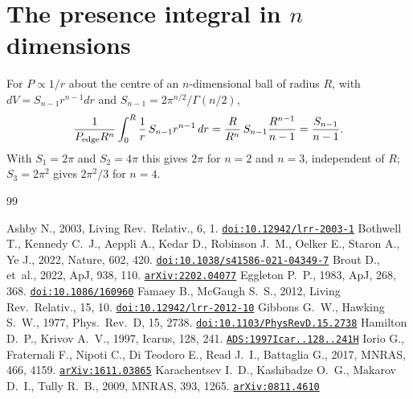 \documentclass[11pt]{article}
\begin{document}
\appendix
\section{The presence integral in $n$ dimensions}
\label{app:k}
For $P\propto1/r$ about the centre of an $n$-dimensional ball of radius $R$, with $dV=S_{n-1}r^{n-1}dr$ and $S_{n-1}=2\pi^{n/2}/\Gamma(n/2)$,
\begin{equation}
\frac{1}{P_{\rm edge}R^n}\int_0^R\frac{1}{r}\,S_{n-1}r^{n-1}\,dr=\frac{R}{R^n}\,S_{n-1}\frac{R^{n-1}}{n-1}=\frac{S_{n-1}}{n-1}.
\end{equation}
With $S_1=2\pi$ and $S_2=4\pi$ this gives $2\pi$ for $n=2$ and $n=3$, independent of $R$; $S_3=2\pi^2$ gives $2\pi^2/3$ for $n=4$.

\begin{thebibliography}{99}
\setlength{\itemsep}{1pt}\small\raggedright
{} Ashby N., 2003, Living Rev.\ Relativ., 6, 1. \href{https://doi.org/10.12942/lrr-2003-1}{\texttt{doi:10.12942/lrr-2003-1}}
 Bothwell T., Kennedy C.~J., Aeppli A., Kedar D., Robinson J.~M., Oelker E., Staron A., Ye J., 2022, Nature, 602, 420. \href{https://doi.org/10.1038/s41586-021-04349-7}{\texttt{doi:10.1038/s41586-021-04349-7}}
 Brout D., et~al., 2022, ApJ, 938, 110. \href{https://arxiv.org/abs/2202.04077}{\texttt{arXiv:2202.04077}}
 Eggleton P.~P., 1983, ApJ, 268, 368. \href{https://doi.org/10.1086/160960}{\texttt{doi:10.1086/160960}}
 Famaey B., McGaugh S.~S., 2012, Living Rev.\ Relativ., 15, 10. \href{https://doi.org/10.12942/lrr-2012-10}{\texttt{doi:10.12942/lrr-2012-10}}
 Gibbons G.~W., Hawking S.~W., 1977, Phys.\ Rev.\ D, 15, 2738. \href{https://doi.org/10.1103/PhysRevD.15.2738}{\texttt{doi:10.1103/PhysRevD.15.2738}}
 Hamilton D.~P., Krivov A.~V., 1997, Icarus, 128, 241. \href{https://ui.adsabs.harvard.edu/abs/1997Icar..128..241H}{\texttt{ADS:1997Icar..128..241H}}
 Iorio G., Fraternali F., Nipoti C., Di Teodoro E., Read J.~I., Battaglia G., 2017, MNRAS, 466, 4159. \href{https://arxiv.org/abs/1611.03865}{\texttt{arXiv:1611.03865}}
 Karachentsev I.~D., Kashibadze O.~G., Makarov D.~I., Tully R.~B., 2009, MNRAS, 393, 1265. \href{https://arxiv.org/abs/0811.4610}{\texttt{arXiv:0811.4610}}

\end{thebibliography}
\end{document}

